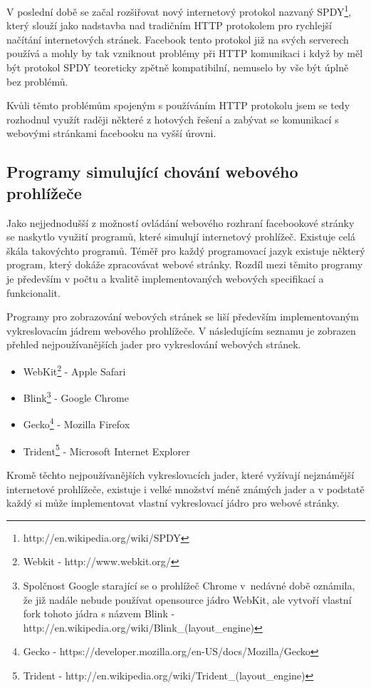 \documentclass[thesis=M,czech]{FITthesis}[2013/05/10]
\begin{document}
V poslední době se začal rozšiřovat nový internetový protokol nazvaný SPDY\footnote{http://en.wikipedia.org/wiki/SPDY}, který slouží jako nadstavba nad tradičním HTTP protokolem pro rychlejší načítání internetových stránek. Facebook tento protokol již na svých serverech používá a mohly by tak vzniknout problémy při HTTP komunikaci i když by měl být protokol SPDY teoreticky zpětně kompatibilní, nemuselo by vše být úplně bez problémů.

Kvůli těmto problémům spojeným s používáním HTTP protokolu jsem se tedy rozhodnul využít raději některé z hotových řešení a zabývat se komunikací s webovými stránkami facebooku na vyšší úrovni. 

\subsection{Programy simulující chování webového prohlížeče}

Jako nejjednodušší z možností ovládání webového rozhraní facebookové stránky se naskytlo využití programů, které simulují internetový prohlížeč. Existuje celá škála takovýchto programů. Téměř pro každý programovací jazyk existuje některý program, který dokáže zpracovávat webové stránky. Rozdíl mezi těmito programy je především v počtu a kvalitě implementovaných webových specifikací a funkcionalit.

Programy pro zobrazování webových stránek se liší především implementovaným vykreslovacím jádrem webového prohlížeče. V následujícím seznamu je zobrazen přehled nejpoužívanějších jader pro vykreslování webových stránek.

\begin{itemize}
  \item WebKit\footnote{Webkit - http://www.webkit.org/} - Apple Safari
  \item Blink\footnote{Spolčnost Google starající se o prohlížeč Chrome v~nedávné době oznámila, že již nadále nebude používat opensource jádro WebKit, ale vytvoří vlastní fork tohoto jádra s názvem Blink -  http://en.wikipedia.org/wiki/Blink\_(layout\_engine)} - Google Chrome
  \item Gecko\footnote{Gecko - https://developer.mozilla.org/en-US/docs/Mozilla/Gecko} - Mozilla Firefox
  \item Trident\footnote{Trident - http://en.wikipedia.org/wiki/Trident\_(layout\_engine)} - Microsoft Internet Explorer
\end{itemize}
 
Kromě těchto nejpoužívanějších vykreslovacích jader, které vyžívají nejznámější internetové prohlížeče, existuje i velké množství méně známých jader a v podstatě každý si může implementovat vlastní vykreslovací jádro pro webové stránky.
\end{document}
